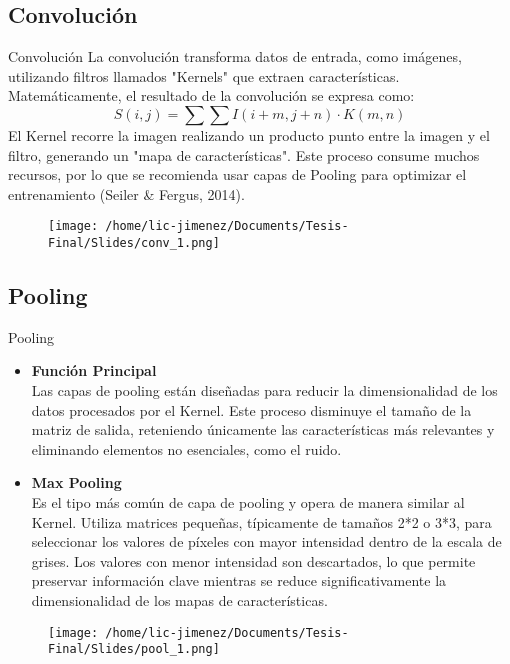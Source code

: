 \documentclass{beamer}
\begin{document}
\subsection{Convolución}
\begin{frame}{Convolución}
    La convolución transforma datos de entrada, como imágenes, utilizando filtros llamados "Kernels" que extraen características. Matemáticamente, el resultado de la convolución se expresa como:
    \[
        S(i,j) = \sum\sum I(i + m, j + n) \cdot K(m, n)
    \]
    El Kernel recorre la imagen realizando un producto punto entre la imagen y el filtro, generando un "mapa de características". Este proceso consume muchos recursos, por lo que se recomienda usar capas de Pooling para optimizar el entrenamiento (Seiler \& Fergus, 2014).
    \begin{figure}
        \centering
        \texttt{[image: /home/lic-jimenez/Documents/Tesis-Final/Slides/conv\_1.png]}
        
    \end{figure}
\end{frame}



\subsection{Pooling}
\begin{frame}{Pooling}
    \begin{itemize}
        \item \textbf{Función Principal} \[\] Las capas de pooling están diseñadas para reducir la dimensionalidad de los datos procesados por el Kernel. Este proceso disminuye el tamaño de la matriz de salida, reteniendo únicamente las características más relevantes y eliminando elementos no esenciales, como el ruido.
        \item \textbf{Max Pooling} \[\] Es el tipo más común de capa de pooling y opera de manera similar al Kernel.
        Utiliza matrices pequeñas, típicamente de tamaños 2*2 o 3*3, para seleccionar los valores de píxeles con mayor intensidad dentro de la escala de grises.
        Los valores con menor intensidad son descartados, lo que permite preservar información clave mientras se reduce significativamente la dimensionalidad de los mapas de características.
    \end{itemize}

    \begin{figure}
        \centering
        \texttt{[image: /home/lic-jimenez/Documents/Tesis-Final/Slides/pool\_1.png]}
    \end{figure}
\end{frame}
\end{document}
